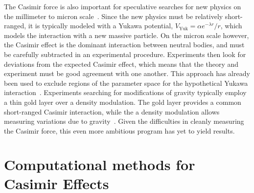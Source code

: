 The Casimir force is also important for speculative searches for new physics on the millimeter to micron
scale~\cite{Dimopoulos2003, Bezerra2011}.  Since the new physics must be relatively short-ranged, 
it is typically modeled with a Yukawa potential, $V_{\text{Yuk}}=\alpha e^{-\lambda r}/r$,
which models the interaction with a new massive particle.    
On the micron scale however, the Casimir effect is the dominant interaction between neutral bodies,
 and must be carefully subtracted in an experimental procedure.
 Experiments then look for deviations from the expected Casimir effect, which means that the 
theory and experiment must be good agreement with one another.  
This approach has already been used to exclude regions of the parameter space for the hypothetical
Yukawa interaction~\cite{Obrecht2007,Bezerra2011}.  
Experiments searching for modifications of gravity typically employ a thin gold layer over
a density modulation.  The gold layer provides a common short-ranged Casimir interaction, while the 
a density modulation allows measuring variations due to gravity~\cite{Sorrentino2009, Geraci2015}.
Given the difficulties in cleanly measuring the Casimir force, this even more ambitious program has yet 
to yield results.  




\section{Computational methods for Casimir Effects}
\label{sec:numerical_review}

